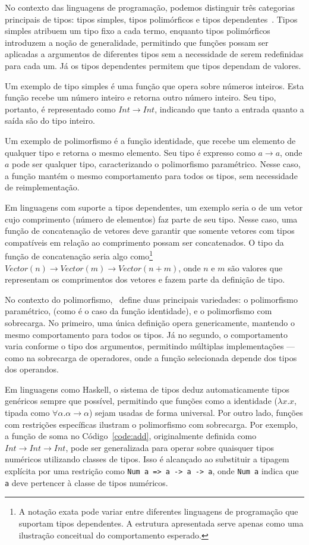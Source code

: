 No contexto das linguagens de programação, podemos distinguir três categorias principais de tipos: tipos simples, tipos polimórficos e tipos dependentes~\cite{pierce2002types}.
Tipos simples atribuem um tipo fixo a cada termo, enquanto tipos polimórficos introduzem a noção de generalidade, permitindo que funções possam ser aplicadas a argumentos de diferentes tipos sem a necessidade de serem redefinidas para cada um.
Já os tipos dependentes permitem que tipos dependam de valores.

Um exemplo de tipo simples é uma função que opera sobre números inteiros.
Esta função recebe um número inteiro e retorna outro número inteiro.
Seu tipo, portanto, é representado como $Int \rightarrow Int$, indicando que tanto a entrada quanto a saída são do tipo inteiro.

Um exemplo de polimorfismo é a função identidade, que recebe um elemento de qualquer tipo e retorna o mesmo elemento.
Seu tipo é expresso como $a \rightarrow a$, onde $a$ pode ser qualquer tipo, caracterizando o polimorfismo paramétrico.
Nesse caso, a função mantém o mesmo comportamento para todos os tipos, sem necessidade de reimplementação.

Em linguagens com suporte a tipos dependentes, um exemplo seria o de um vetor cujo comprimento (número de elementos) faz parte de seu tipo.
Nesse caso, uma função de concatenação de vetores deve garantir que somente vetores com tipos compatíveis em relação ao comprimento possam ser concatenados.
O tipo da função de concatenação seria algo como\footnote{A notação exata pode variar entre diferentes linguagens de programação que suportam tipos dependentes. A estrutura apresentada serve apenas como uma ilustração conceitual do comportamento esperado.} $Vector(n) \rightarrow Vector(m) \rightarrow Vector(n+m)$, onde $n$ e $m$ são valores que representam os comprimentos dos vetores e fazem parte da definição de tipo.

No contexto do polimorfismo,~ define duas principais variedades: o polimorfismo paramétrico, (como é o caso da função identidade), e o polimorfismo com sobrecarga.
No primeiro, uma única definição opera genericamente, mantendo o mesmo comportamento para todos os tipos. 
Já no segundo, o comportamento varia conforme o tipo dos argumentos, permitindo múltiplas implementações — como na sobrecarga de operadores, onde a função selecionada depende dos tipos dos operandos.

Em linguagens como Haskell, o sistema de tipos deduz automaticamente tipos genéricos sempre que possível, permitindo que funções como a identidade ($\lambda x.x$, tipada como $\forall \alpha. \alpha \to \alpha$) sejam usadas de forma universal. 
Por outro lado, funções com restrições específicas ilustram o polimorfismo com sobrecarga. 
Por exemplo, a função de soma no Código~\ref{code:add}, originalmente definida como $Int \rightarrow Int \rightarrow Int$, pode ser generalizada para operar sobre quaisquer tipos numéricos utilizando classes de tipos. 
Isso é alcançado ao substituir a tipagem explícita por uma restrição como \texttt{Num a => a -> a -> a}, onde \texttt{Num a} indica que \texttt{a} deve pertencer à classe de tipos numéricos.

